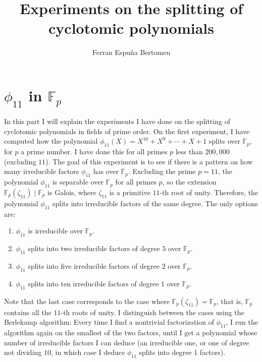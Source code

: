 \documentclass[11pt]{article}
\title{Experiments on the splitting of cyclotomic polynomials}
\author{Ferran Espuña Bertomeu}
\theoremstyle{definition}
\begin{document}
    \maketitle

    \section{$\phi_{11}$ in $\mathbb{F}_p$}

    \noindent In this part I will explain the experiments I have done on the splitting of cyclotomic polynomials in fields of prime order.
    On the first experiment, I have computed how the polynomial $\phi_{11}(X) = X^{10} + X^9 + \cdots + X + 1$ splits over $\mathbb{F}_p$,
    for $p$ a prime number.
    I have done this for all primes $p$ less than $200,000$ (excluding $11$).
    The goal of this experiment is to see if there is a pattern on how many irreducible factors $\phi_{11}$ has
    over $\mathbb{F}_p$.
    Excluding the prime $p = 11$, the polynomial $\phi_{11}$ is separable over $\mathbb{F}_p$ for all primes $p$, so the
    extension $\mathbb{F}_p(\zeta_{11})\mid\mathbb{F}_p$ is Galois, where $\zeta_{11}$ is a primitive $11$-th root of unity.
    Therefore, the polynomial $\phi_{11}$ splits into
    irreducible factors of the same degree.
    The only options are:
    \begin{enumerate}
        \item $\phi_{11}$ is irreducible over $\mathbb{F}_p$.
        \item $\phi_{11}$ splits into two irreducible factors of degree $5$ over $\mathbb{F}_p$.
        \item $\phi_{11}$ splits into five irreducible factors of degree $2$ over $\mathbb{F}_p$.
        \item $\phi_{11}$ splits into ten irreducible factors of degree $1$ over $\mathbb{F}_p$.
    \end{enumerate}

    \noindent Note that the last case corresponds to the case where $\mathbb{F}_p(\zeta_{11}) = \mathbb{F}_p$, that is,
    $\mathbb{F}_p$ contains all the $11$-th roots of unity.
    I distinguish between the cases using the Berlekamp algorithm:
    Every time I find a nontrivial factorization of $\phi_{11}$, I run the algorithm again on the smallest of the two factors,
    until I get a polynomial whose number of irreducible factors I can deduce (an irreducible one, or one of degree not dividing $10$,
    in which case I deduce $\phi_{11}$ splits into degree 1 factors).
\end{document}
